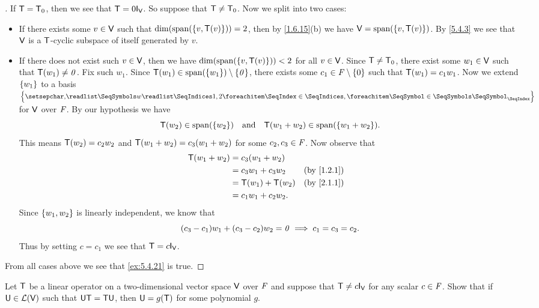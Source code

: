 \begin{proof}[]
	If \(\mathsf{T} = \mathsf{T}_0\), then we see that \(\T = 0 \IT[\V]\).
	So suppose that \(\mathsf{T} \neq \mathsf{T}_0\).
	Now we split into two cases:
	\begin{itemize}
		\item If there exists some \(v \in \mathsf{V}\) such that \(\dim(\spn{\set{v, \T(v)}}) = 2\), then by \cref{1.6.15}(b) we have \(\V = \spn{\set{v, \T(v)}}\).
		      By \cref{5.4.3} we see that \(\mathsf{V}\) is a \(\mathsf{T}\)-cyclic subspace of itself generated by \(v\).
		\item If there does not exist such \(v \in \mathsf{V}\), then we have \(\dim(\spn{\set{v, \T(v)}}) < 2\) for all \(v \in \mathsf{V}\).
		      Since \(\mathsf{T} \neq \mathsf{T}_0\), there exist some \(w_1 \in \mathsf{V}\) such that \(\mathsf{T}(w_1) \neq \mathit{0}\).
		      Fix such \(w_1\).
		      Since \(\T(w_1) \in \spn{\set{w_1}} \setminus \set{\zv}\), there exists some \(c_1 \in \mathit{F} \setminus \left\lbrace0\right\rbrace\) such that \(\mathsf{T}(w_1) = c_1 w_1\).
		      Now we extend \(\left\lbrace w_1\right\rbrace\) to a basis \(\set{\seq{w}{1,2}}\) for \(\mathsf{V}\) over \(\mathit{F}\).
		      By our hypothesis we have
		      \[
			      \T(w_2) \in \spn{\set{w_2}} \quad \text{and} \quad \T(w_1 + w_2) \in \spn{\set{w_1 + w_2}}.
		      \]
		      This means \(\mathsf{T}(w_2) = c_2 w_2\) and \(\mathsf{T}(w_1 + w_2) = c_3 (w_1 + w_2)\) for some \(c_2, c_3 \in \mathit{F}\).
		      Now observe that
		      \begin{align*}
			      \T(w_1 + w_2) & = c_3 (w_1 + w_2)                    \\
			                    & = c_3 w_1 + c_3 w_2  &  & \by{1.2.1} \\
			                    & = \T(w_1) + \T(w_2)  &  & \by{2.1.1} \\
			                    & = c_1 w_1 + c_2 w_2.
		      \end{align*}
		      Since \(\left\lbrace w_1, w_2\right\rbrace\) is linearly independent, we know that
		      \[
			      (c_3 - c_1) w_1 + (c_3 - c_2) w_2 = \mathit{0} \implies c_1 = c_3 = c_2.
		      \]
		      Thus by setting \(c = c_1\) we see that \(\T = c \IT[\V]\).
	\end{itemize}
	From all cases above we see that \cref{ex:5.4.21} is true.
\end{proof}

\begin{ex}\label{ex:5.4.22}
	Let \(\mathsf{T}\) be a linear operator on a two-dimensional vector space \(\mathsf{V}\) over \(\mathit{F}\) and suppose that \(\T \neq c \IT[\V]\) for any scalar \(c \in \mathit{F}\).
	Show that if \(\mathsf{U} \in \mathcal{L}(\mathsf{V})\) such that \(\mathsf{U} \mathsf{T} = \mathsf{T} \mathsf{U}\), then \(\mathsf{U} = g(\mathsf{T})\) for some polynomial \(g\).
\end{ex}

